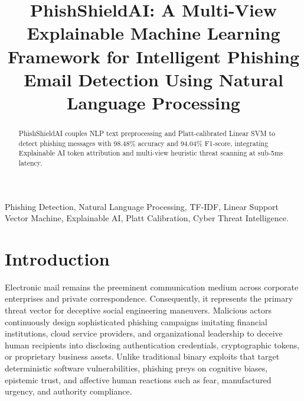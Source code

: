 \documentclass[conference]{IEEEtran}
\begin{document}
\title{PhishShieldAI: A Multi-View Explainable Machine Learning Framework for Intelligent Phishing Email Detection Using Natural Language Processing}

\author{
\and
{}
}

\maketitle

\begin{abstract}
PhishShieldAI couples NLP text preprocessing and Platt-calibrated Linear SVM to detect phishing messages with 98.48\% accuracy and 94.04\% F1-score, integrating Explainable AI token attribution and multi-view heuristic threat scanning at sub-5ms latency.
\end{abstract}

\begin{IEEEkeywords}
Phishing Detection, Natural Language Processing, TF-IDF, Linear Support Vector Machine, Explainable AI, Platt Calibration, Cyber Threat Intelligence.
\end{IEEEkeywords}

\section{Introduction}
Electronic mail remains the preeminent communication medium across corporate enterprises and private correspondence. Consequently, it represents the primary threat vector for deceptive social engineering maneuvers. Malicious actors continuously design sophisticated phishing campaigns imitating financial institutions, cloud service providers, and organizational leadership to deceive human recipients into disclosing authentication credentials, cryptographic tokens, or proprietary business assets. Unlike traditional binary exploits that target deterministic software vulnerabilities, phishing preys on cognitive biases, epistemic trust, and affective human reactions such as fear, manufactured urgency, and authority compliance. 
\end{document}
